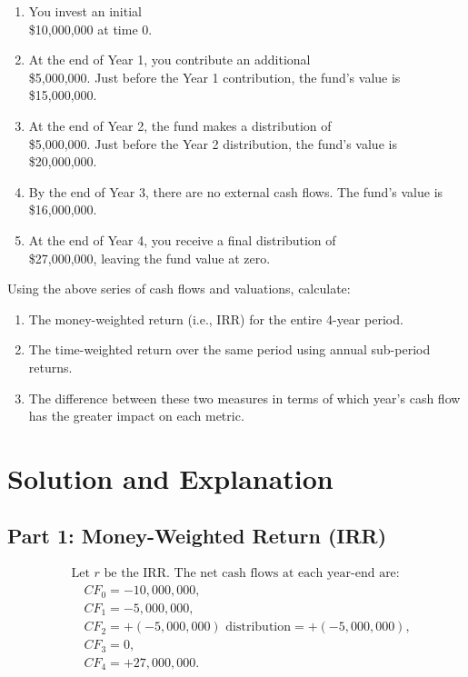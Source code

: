 \begin{enumerate}
\item You invest an initial \\\$10{,}000{,}000 at time 0.
\item At the end of Year 1, you contribute an additional \\\$5{,}000{,}000. Just before the Year 1 contribution, the fund’s value is \\\$15{,}000{,}000.
\item At the end of Year 2, the fund makes a distribution of \\\$5{,}000{,}000. Just before the Year 2 distribution, the fund’s value is \\\$20{,}000{,}000.
\item By the end of Year 3, there are no external cash flows. The fund’s value is \\\$16{,}000{,}000.
\item At the end of Year 4, you receive a final distribution of \\\$27{,}000{,}000, leaving the fund value at zero.
\end{enumerate}

Using the above series of cash flows and valuations, calculate:

\begin{enumerate}
\item The money-weighted return (i.e., IRR) for the entire 4-year period.  
\item The time-weighted return over the same period using annual sub-period returns.  
\item The difference between these two measures in terms of which year’s cash flow has the greater impact on each metric.  
\end{enumerate}

\section*{Solution and Explanation}

\subsection*{Part 1: Money-Weighted Return (IRR)}

\[
\begin{aligned}
&\text{Let } r \text{ be the IRR. The net cash flows at each year-end are:}\\
&\quad CF_{0} = -10{,}000{,}000,\\
&\quad CF_{1} = -5{,}000{,}000,\\
&\quad CF_{2} = +(-5{,}000{,}000)\text{ distribution} = +(-5{,}000{,}000),\\
&\quad CF_{3} = 0,\\
&\quad CF_{4} = +27{,}000{,}000.\\
\end{aligned}
\]

